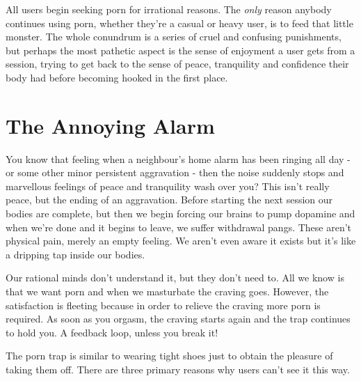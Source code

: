 \documentclass[
]{book}
\begin{document}
All users begin seeking porn for irrational reasons. The \emph{only} reason anybody continues using porn, whether they're a casual or heavy user, is to feed that little monster. The whole conundrum is a series of cruel and confusing punishments, but perhaps the most pathetic aspect is the sense of enjoyment a user gets from a session, trying to get back to the sense of peace, tranquility and confidence their body had before becoming hooked in the first place.

\hypertarget{the-annoying-alarm}{%
\section{The Annoying Alarm}\label{the-annoying-alarm}}

You know that feeling when a neighbour's home alarm has been ringing all day - or some other minor persistent aggravation - then the noise suddenly stops and marvellous feelings of peace and tranquility wash over you? This isn't really peace, but the ending of an aggravation. Before starting the next session our bodies are complete, but then we begin forcing our brains to pump dopamine and when we're done and it begins to leave, we suffer withdrawal pangs. These aren't physical pain, merely an empty feeling. We aren't even aware it exists but it's like a dripping tap inside our bodies.

Our rational minds don't understand it, but they don't need to. All we know is that we want porn and when we masturbate the craving goes. However, the satisfaction is fleeting because in order to relieve the craving more porn is required. As soon as you orgasm, the craving starts again and the trap continues to hold you. A feedback loop, unless you break it!

The porn trap is similar to wearing tight shoes just to obtain the pleasure of taking them off. There are three primary reasons why users can't see it this way.
\end{document}
